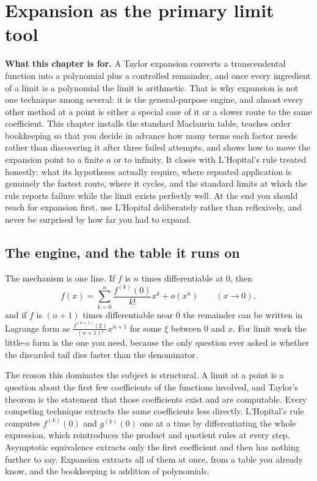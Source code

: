 \chapter{Expansion as the primary limit tool}

\begin{orient}
\textbf{What this chapter is for.} A Taylor expansion converts a transcendental function into a polynomial plus a controlled remainder, and once every ingredient of a limit is a polynomial the limit is arithmetic. That is why expansion is not one technique among several: it is the general-purpose engine, and almost every other method at a point is either a special case of it or a slower route to the same coefficient. This chapter installs the standard Maclaurin table, teaches order bookkeeping so that you decide in advance how many terms each factor needs rather than discovering it after three failed attempts, and shows how to move the expansion point to a finite $a$ or to infinity. It closes with L'Hopital's rule treated honestly: what its hypotheses actually require, where repeated application is genuinely the fastest route, where it cycles, and the standard limits at which the rule reports failure while the limit exists perfectly well. At the end you should reach for expansion first, use L'Hopital deliberately rather than reflexively, and never be surprised by how far you had to expand.
\end{orient}

\section{The engine, and the table it runs on}

The mechanism is one line. If $f$ is $n$ times differentiable at $0$, then
\[
f(x)=\sum_{k=0}^{n}\frac{f^{(k)}(0)}{k!}x^{k}+o(x^{n})\qquad(x\to0),
\]
and if $f$ is $(n+1)$ times differentiable near $0$ the remainder can be written in Lagrange form as $\frac{f^{(n+1)}(\xi)}{(n+1)!}x^{n+1}$ for some $\xi$ between $0$ and $x$. For limit work the little-o form is the one you need, because the only question ever asked is whether the discarded tail dies faster than the denominator.

The reason this dominates the subject is structural. A limit at a point is a question about the first few coefficients of the functions involved, and Taylor's theorem is the statement that those coefficients exist and are computable. Every competing technique extracts the same coefficients less directly. L'Hopital's rule computes $f^{(k)}(0)$ and $g^{(k)}(0)$ one at a time by differentiating the whole expression, which reintroduces the product and quotient rules at every step. Asymptotic equivalence extracts only the first coefficient and then has nothing further to say. Expansion extracts all of them at once, from a table you already know, and the bookkeeping is addition of polynomials.

